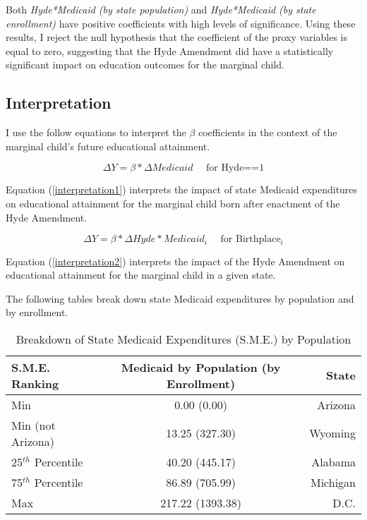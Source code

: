     Both \textit{Hyde*Medicaid (by state population)} and \textit{Hyde*Medicaid (by state enrollment)} have positive coefficients with high levels of significance. Using these results, I reject the null hypothesis that the coefficient of the proxy variables is equal to zero, suggesting that the Hyde Amendment did have a statistically significant impact on education outcomes for the marginal child.



    \subsection{Interpretation}
        I use the follow equations to interpret the $\beta$ coefficients in the context of the marginal child's future educational attainment.

            \begin{equation}\label{interpretation1}
                \Delta Y = \beta*\Delta Medicaid \text{~~~ for Hyde==1}
            \end{equation}

        Equation (\ref{interpretation1}) interprets the impact of state Medicaid expenditures on educational attainment for the marginal child born after enactment of the Hyde Amendment.

            \begin{equation}\label{interpretation2}
                \Delta Y = \beta*\Delta Hyde*Medicaid_{i} \text{~~~ for Birthplace$_{i}$}
            \end{equation}

        Equation (\ref{interpretation2}) interprets the impact of the Hyde Amendment on educational attainment for the marginal child in a given state.

        The following tables break down state Medicaid expenditures by population and by enrollment.


            \begin{table}[H]
                \caption{Breakdown of State Medicaid Expenditures (S.M.E.) by Population}
                \centering\footnotesize{
                \begin{tabular}{lcr}
                \hline
                S.M.E. Ranking & Medicaid by Population (by Enrollment) & State\\
                \hline
                Min & 0.00 (0.00) & Arizona\\
                Min (not Arizona) & 13.25 (327.30) & Wyoming\\
                25$^{th}$ Percentile & 40.20 (445.17) & Alabama\\
                75$^{th}$ Percentile & 86.89 (705.99) & Michigan\\
                Max & 217.22 (1393.38) & D.C.\\
                \hline
                \end{tabular}}
            \end{table}

